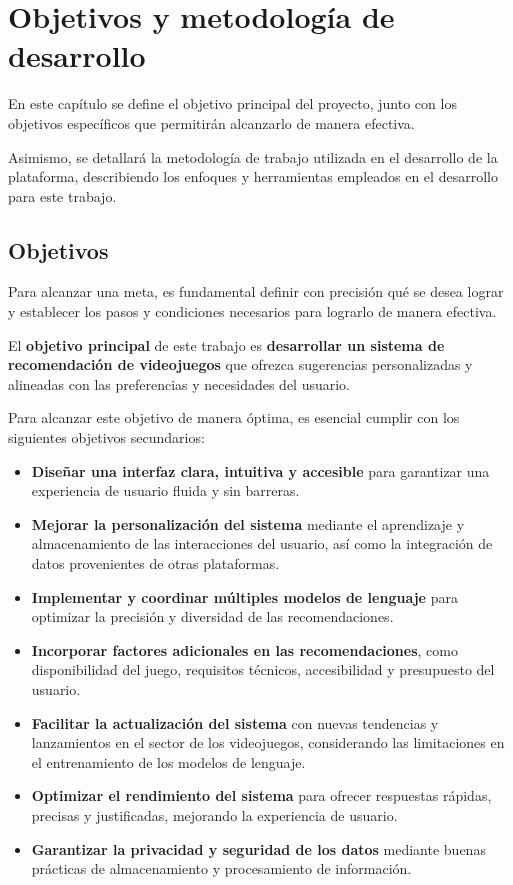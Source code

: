 \chapter{Objetivos y metodología de desarrollo}

En este capítulo se define el objetivo principal del proyecto, junto con los objetivos específicos que permitirán alcanzarlo de manera efectiva.

Asimismo, se detallará la metodología de trabajo utilizada en el desarrollo de la plataforma, describiendo los enfoques y herramientas empleados en el desarrollo para este trabajo.
\newpage
\section{Objetivos}

Para alcanzar una meta, es fundamental definir con precisión qué se desea lograr y establecer los pasos y condiciones necesarios para lograrlo de manera efectiva.

El \textbf{objetivo principal} de este trabajo es \textbf{desarrollar un sistema de recomendación de videojuegos} que ofrezca sugerencias personalizadas y alineadas con las preferencias y necesidades del usuario.

Para alcanzar este objetivo de manera óptima, es esencial cumplir con los siguientes objetivos secundarios:

\begin{itemize}
    \item \textbf{Diseñar una interfaz clara, intuitiva y accesible} para garantizar una experiencia de usuario fluida y sin barreras.
    \item \textbf{Mejorar la personalización del sistema} mediante el aprendizaje y almacenamiento de las interacciones del usuario, así como la integración de datos provenientes de otras plataformas.
    \item \textbf{Implementar y coordinar múltiples modelos de lenguaje} para optimizar la precisión y diversidad de las recomendaciones.
    \item \textbf{Incorporar factores adicionales en las recomendaciones}, como disponibilidad del juego, requisitos técnicos, accesibilidad y presupuesto del usuario.
    \item \textbf{Facilitar la actualización del sistema} con nuevas tendencias y lanzamientos en el sector de los videojuegos, considerando las limitaciones en el entrenamiento de los modelos de lenguaje.
    \item \textbf{Optimizar el rendimiento del sistema} para ofrecer respuestas rápidas, precisas y justificadas, mejorando la experiencia de usuario.
    \item \textbf{Garantizar la privacidad y seguridad de los datos} mediante buenas prácticas de almacenamiento y procesamiento de información.
\end{itemize}

